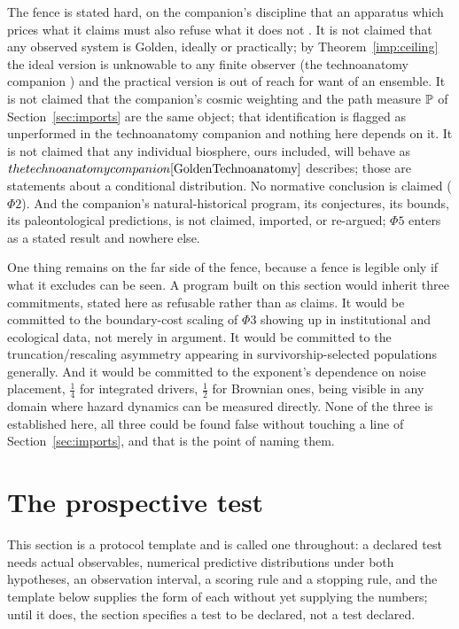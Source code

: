 The fence is stated hard, on the companion's discipline that an
apparatus which prices what it claims must also refuse what it does not
\cite{AethusOptimalEarth}. It is not claimed that any observed system is Golden, ideally or
practically; by Theorem~\ref{imp:ceiling} the ideal version is
unknowable to any finite observer (the technoanatomy companion \cite{GoldenTechnoanatomy}) and
the practical version is out of reach for want of an ensemble. It is not claimed that the companion's cosmic
weighting and the path measure $\mathbb{P}$ of
Section~\ref{sec:imports} are the same object; that
identification is flagged as unperformed in
the technoanatomy companion \cite{GoldenTechnoanatomy} and nothing here depends on it. It is not
claimed that any individual biosphere, ours included, will behave as
$the technoanatomy companion \cite{GoldenTechnoanatomy}$ describes; those are statements about a
conditional distribution. No normative conclusion is claimed
($\Phi2$). And the companion's natural-historical program, its
conjectures, its bounds, its paleontological predictions, is not
claimed, imported, or re-argued; $\Phi5$ enters as a stated result and
nowhere else.

One thing remains on the far side of the fence, because a fence is
legible only if what it excludes can be seen. A program built on this
section would inherit three commitments, stated here as refusable rather
than as claims. It would be committed to the boundary-cost scaling of
$\Phi3$ showing up in institutional and ecological data, not merely in
argument. It would be committed to the truncation/rescaling asymmetry
appearing in survivorship-selected populations generally. And it would
be committed to the exponent's dependence on noise placement, $\tfrac14$
for integrated drivers, $\tfrac12$ for Brownian ones, being visible
in any domain where hazard dynamics can be measured directly. None of
the three is established here, all three could be found false without
touching a line of Section~\ref{sec:imports}, and that is the
point of naming them.


\section{The prospective test}\label{sec:protocol}

\noindent This section is a protocol template and is called one throughout: a declared test needs actual observables, numerical predictive distributions under both hypotheses, an observation interval, a scoring rule and a stopping rule, and the template below supplies the form of each without yet supplying the numbers; until it does, the section specifies a test to be declared, not a test declared.

